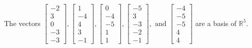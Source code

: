 \begin{exercise}
\begin{exerciseStatement}
  \end{exerciseStatement}
  \begin{exerciseAnswer}
   The vectors \(\left[\begin{array}{r}
-2 \\
3 \\
0 \\
-3 \\
-3
\end{array}\right] , \left[\begin{array}{r}
1 \\
-4 \\
4 \\
3 \\
-1
\end{array}\right] , \left[\begin{array}{r}
0 \\
-4 \\
-5 \\
1 \\
1
\end{array}\right] , \left[\begin{array}{r}
-5 \\
3 \\
-3 \\
-2 \\
-1
\end{array}\right] , \text{ and } \left[\begin{array}{r}
-4 \\
-5 \\
-5 \\
4 \\
4
\end{array}\right]\) 
  	 are  a basis of \(\mathbb{R}^5\).
  


  \end{exerciseAnswer}
\end{exercise}